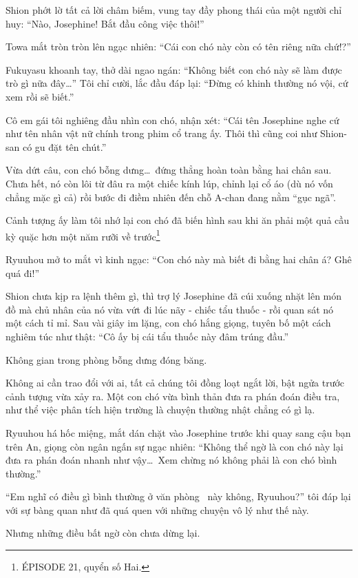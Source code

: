 \documentclass[../main.tex]{subfiles}
\begin{document}
Shion phớt lờ tất cả lời châm biếm, vung tay đầy phong thái của một người chỉ huy: ``Nào, Josephine! Bắt đầu công việc thôi!''

Towa mắt tròn tròn lên ngạc nhiên: ``Cái con chó này còn có tên riêng nữa chứ!?''

Fukuyasu khoanh tay, thở dài ngao ngán: ``Không biết con chó này sẽ làm được trò gì nữa đây\dots'' Tôi chỉ cười, lắc đầu đáp lại: ``Đừng có khinh thường nó vội, cứ xem rồi sẽ biết.''

Cô em gái tôi nghiêng đầu nhìn con chó, nhận xét: ``Cái tên Josephine nghe cứ như tên nhân vật nữ chính trong phim cổ trang ấy. Thôi thì cũng coi như Shion-san có gu đặt tên chút.''

Vừa dứt câu, con chó bỗng dưng\dots\ đứng thẳng hoàn toàn bằng hai chân sau. Chưa hết, nó còn lôi từ đâu ra một chiếc kính lúp, chỉnh lại cổ áo (dù nó vốn chẳng mặc gì cả) rồi bước đi điềm nhiên đến chỗ A-chan đang nằm ``gục ngã''.

Cảnh tượng ấy làm tôi nhớ lại con chó đã biến hình sau khi ăn phải một quả cầu kỳ quặc hơn một năm rưỡi về trước\footnote{{\flaregothic ÉPISODE 21}, quyển số Hai.}

Ryuuhou mở to mắt vì kinh ngạc: ``Con chó này mà biết đi bằng hai chân á? Ghê quá đi!''

Shion chưa kịp ra lệnh thêm gì, thì trợ lý Josephine đã cúi xuống nhặt lên món đồ mà chủ nhân của nó vừa vứt đi lúc nãy - chiếc tẩu thuốc - rồi quan sát nó một cách tỉ mỉ. Sau vài giây im lặng, con chó hắng giọng, tuyên bố một cách nghiêm túc như thật: ``Cô ấy bị cái tẩu thuốc này đâm trúng đầu.''


Không gian trong phòng bỗng dưng đóng băng.

Không ai cần trao đổi với ai, tất cả chúng tôi đồng loạt ngắt lời, bật ngửa trước cảnh tượng vừa xảy ra. Một con chó vừa bình thản đưa ra phán đoán điều tra, như thể việc phân tích hiện trường là chuyện thường nhật chẳng có gì lạ.

Ryuuhou há hốc miệng, mắt dán chặt vào Josephine trước khi quay sang cậu bạn trên An, giọng còn ngân ngấn sự ngạc nhiên: ``Không thể ngờ là con chó này lại đưa ra phán đoán nhanh như vậy\dots\ Xem chừng nó không phải là con chó bình thường.''

``Em nghĩ có điều gì bình thường ở văn phòng \hll\ này không, Ryuuhou?'' tôi đáp lại với sự bàng quan như đã quá quen với những chuyện vô lý như thế này.

Nhưng những điều bất ngờ còn chưa dừng lại.
\end{document}
